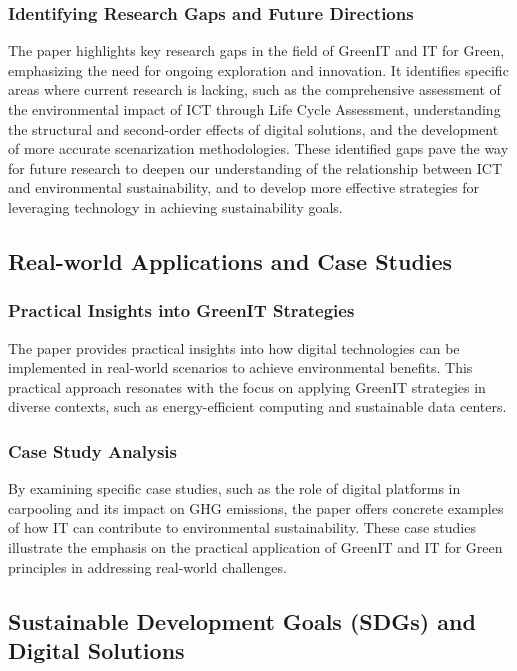 \documentclass[conference,compsoc]{IEEEtran}
\begin{document}
\subsubsection{Identifying Research Gaps and Future Directions}

The paper highlights key research gaps in the field of GreenIT and IT for Green, emphasizing the need for ongoing exploration and innovation. It identifies specific areas where current research is lacking, such as the comprehensive assessment of the environmental impact of ICT through Life Cycle Assessment, understanding the structural and second-order effects of digital solutions, and the development of more accurate scenarization methodologies. These identified gaps pave the way for future research to deepen our understanding of the relationship between ICT and environmental sustainability, and to develop more effective strategies for leveraging technology in achieving sustainability goals.

\subsection{Real-world Applications and Case Studies}

\subsubsection{Practical Insights into GreenIT Strategies}

The paper provides practical insights into how digital technologies can be implemented in real-world scenarios to achieve environmental benefits. This practical approach resonates with the  focus on applying GreenIT strategies in diverse contexts, such as energy-efficient computing and sustainable data centers.

\subsubsection{Case Study Analysis}

By examining specific case studies, such as the role of digital platforms in carpooling and its impact on GHG emissions, the paper offers concrete examples of how IT can contribute to environmental sustainability. These case studies illustrate the  emphasis on the practical application of GreenIT and IT for Green principles in addressing real-world challenges.

\subsection{Sustainable Development Goals (SDGs) and Digital Solutions}
\end{document}
